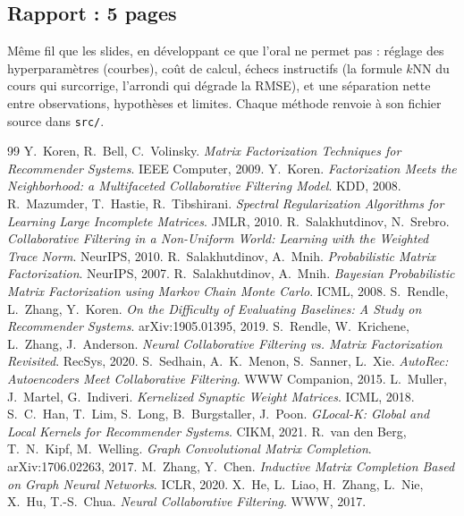\documentclass[11pt,a4paper]{article}
\begin{document}
\subsection{Rapport : 5 pages}

Même fil que les slides, en développant ce que l'oral ne permet pas :
réglage des hyperparamètres (courbes), coût de calcul, échecs instructifs (la
formule $k$NN du cours qui surcorrige, l'arrondi qui dégrade la RMSE), et une
séparation nette entre observations, hypothèses et limites. Chaque méthode
renvoie à son fichier source dans \texttt{src/}.

\begin{thebibliography}{99}
\small
{} Y.~Koren, R.~Bell, C.~Volinsky. \emph{Matrix Factorization
  Techniques for Recommender Systems}. IEEE Computer, 2009.
 Y.~Koren. \emph{Factorization Meets the Neighborhood: a
  Multifaceted Collaborative Filtering Model}. KDD, 2008.
 R.~Mazumder, T.~Hastie, R.~Tibshirani. \emph{Spectral
  Regularization Algorithms for Learning Large Incomplete Matrices}. JMLR, 2010.
 R.~Salakhutdinov, N.~Srebro. \emph{Collaborative Filtering in
  a Non-Uniform World: Learning with the Weighted Trace Norm}. NeurIPS, 2010.
 R.~Salakhutdinov, A.~Mnih. \emph{Probabilistic Matrix
  Factorization}. NeurIPS, 2007.
 R.~Salakhutdinov, A.~Mnih. \emph{Bayesian Probabilistic Matrix
  Factorization using Markov Chain Monte Carlo}. ICML, 2008.
 S.~Rendle, L.~Zhang, Y.~Koren. \emph{On the Difficulty of
  Evaluating Baselines: A Study on Recommender Systems}. arXiv:1905.01395, 2019.
 S.~Rendle, W.~Krichene, L.~Zhang, J.~Anderson. \emph{Neural
  Collaborative Filtering vs. Matrix Factorization Revisited}. RecSys, 2020.
 S.~Sedhain, A.~K.~Menon, S.~Sanner, L.~Xie. \emph{AutoRec:
  Autoencoders Meet Collaborative Filtering}. WWW Companion, 2015.
 L.~Muller, J.~Martel, G.~Indiveri. \emph{Kernelized Synaptic
  Weight Matrices}. ICML, 2018.
 S.~C.~Han, T.~Lim, S.~Long, B.~Burgstaller, J.~Poon.
  \emph{GLocal-K: Global and Local Kernels for Recommender Systems}. CIKM, 2021.
 R.~van den Berg, T.~N.~Kipf, M.~Welling. \emph{Graph Convolutional
  Matrix Completion}. arXiv:1706.02263, 2017.
 M.~Zhang, Y.~Chen. \emph{Inductive Matrix Completion Based on
  Graph Neural Networks}. ICLR, 2020.
 X.~He, L.~Liao, H.~Zhang, L.~Nie, X.~Hu, T.-S.~Chua. \emph{Neural
  Collaborative Filtering}. WWW, 2017.
\end{thebibliography}
\end{document}
